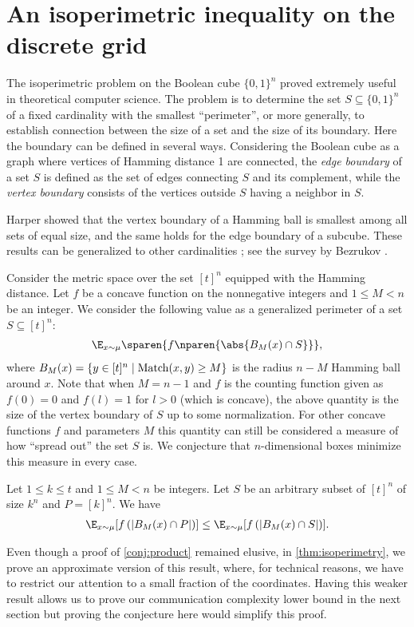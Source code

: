 \section{An isoperimetric inequality on the discrete grid}
\label{sec:isoperimetry}
The isoperimetric problem on the Boolean cube $\{0,1\}^n$ proved
extremely useful in theoretical computer science. The problem is
to determine the set $S\subseteq \{0,1\}^n$ of a fixed
cardinality with the smallest ``perimeter'', or more generally,
to establish connection between the size of a set and the size
of its boundary. Here the boundary can be defined in several
ways. Considering the Boolean cube as a graph where vertices of
Hamming distance 1 are connected, the {\em edge boundary} of a
set $S$ is defined as the set of edges connecting $S$ and its
complement, while the {\em vertex boundary} consists of the
vertices outside $S$ having a neighbor in $S$.

Harper \cite{Harper1964} showed that the vertex boundary of a
Hamming ball is smallest among all sets of equal size, and the
same holds for the edge boundary of a subcube. These results can
be generalized to other cardinalities \cite{Hart1976}; see the
survey by Bezrukov \cite{Bezrukov1994}.

Consider the metric space over the set $[t]^n$ equipped 
with the Hamming distance.
Let $f$ be a concave function on the nonnegative integers 
and $1\le M<n$ be an integer. 
We consider the following
value as a generalized perimeter of a set $S\subseteq[t]^n$:
\begin{align*}
\E_{x\sim\mu}\sparen{f\nparen{\abs{B_M(x)\cap S}}},
\end{align*}
where $B_M(x)=\{y\in[t]^n\mid\operatorname{Match}(x,y)\ge M\}$ is the radius
$n-M$ Hamming ball around $x$. Note that when $M=n-1$ and $f$ is
the counting function given as $f(0)=0$ and $f(l)=1$ for $l>0$
(which is concave), the above quantity is the size of the vertex 
boundary of $S$ up to some normalization. For other concave functions
$f$ and parameters $M$ this quantity can still be considered a
measure of how ``spread out'' the set $S$ is. We conjecture that
$n$-dimensional boxes minimize this measure in every case.

\begin{conjecture}
\label{conj:product}
Let $1\le k\le t$ and $1\le M<n$ be integers. 
Let $S$ be an arbitrary subset of $[t]^n$ of size $k^n$ and 
$P=[k]^n$. We have
\begin{align*}
\E_{x\sim\mu}[f\left(\left|B_M(x)\cap P\right|\right)]\leq
\E_{x\sim\mu}[f\left(\left|B_M(x)\cap S\right|\right)].
\end{align*}
\end{conjecture}
Even though a proof of \autoref{conj:product} remained elusive,
in \autoref{thm:isoperimetry}, we prove an approximate version
of this result, where, for technical reasons, we have to
restrict our attention to a small fraction of the coordinates.
Having this weaker result allows us to prove our communication
complexity lower bound in the next section but proving the
conjecture here would simplify this proof.

